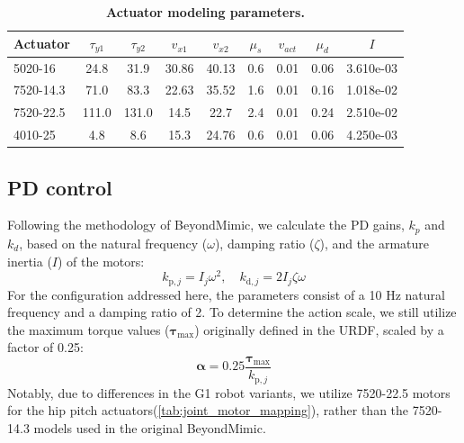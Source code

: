 \begin{table}[htbp]
  \centering
  \setlength{\tabcolsep}{3pt}
  \caption{\textbf{Actuator modeling parameters.}}
  \label{tab:actuator_model}
  \begin{tabular}{lcccccccc}
    \hline
    Actuator & $\tau_{y1}$ & $\tau_{y2}$ & $v_{x1}$ & $v_{x2}$ & $\mu_{s}$ & $v_{act}$ & $\mu_{d}$ & $I$ \\
    \hline
    5020-16   & 24.8  & 31.9  & 30.86 & 40.13 & 0.6 & 0.01 & 0.06 & 3.610e-03 \\
    7520-14.3 & 71.0  & 83.3  & 22.63 & 35.52 & 1.6 & 0.01 & 0.16 & 1.018e-02 \\
    7520-22.5 & 111.0 & 131.0 & 14.5  & 22.7  & 2.4 & 0.01 & 0.24 & 2.510e-02 \\
    4010-25   & 4.8   & 8.6   & 15.3  & 24.76 & 0.6 & 0.01 & 0.06 & 4.250e-03 \\
    \hline
  \end{tabular}
\end{table}



\subsection{PD control}
Following the methodology of BeyondMimic, we calculate the PD gains, $k_p$ and $k_d$, based on the natural frequency ($\omega$), damping ratio ($\zeta$), and the armature inertia ($I$) of the motors:$$k_{\mathrm{p},j} = I_j \omega^2, \quad k_{\mathrm{d},j} = 2 I_j \zeta \omega$$For the configuration addressed here, the parameters consist of a 10 Hz natural frequency and a damping ratio of 2. To determine the action scale, we still utilize the maximum torque values ($\boldsymbol{\tau}_{\text{max}}$) originally defined in the URDF, scaled by a factor of 0.25\cite{liao2025beyondmimic}:
$$\boldsymbol{\alpha} = 0.25\frac{\boldsymbol{\tau}_{\text{max}}}{k_{\mathrm{p},j}}$$ Notably, due to differences in the G1 robot variants, we utilize 7520-22.5 motors for the hip pitch actuators(\cref{tab:joint_motor_mapping}), rather than the 7520-14.3 models used in the original BeyondMimic.


